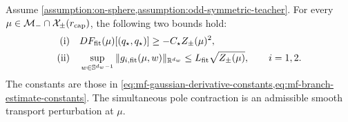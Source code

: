 \begin{lemma}
\label{lem:mf-pole-contraction-estimates}
Assume \cref{assumption:on-sphere,assumption:odd-symmetric-teacher}.
For every \(\mu\in\mathcal{M}_{-}\cap
\mathcal X_\pm(r_{\mathrm{cap}})\), the following two bounds hold:
\begin{equation}
\label{eq:mf-pole-contraction-estimates}
\begin{aligned}
 \textup{(i)}\quad &DF_{\mathrm{fit}}(\mu)[(q_\star,q_\star)]
                  \ge-C_\star Z_\pm(\mu)^2,\\
 \textup{(ii)}\quad &\sup_{w\in\mathbb{S}^{d_w-1}}
       \|g_{i,\mathrm{fit}}(\mu,w)\|_{\mathbb R^{d_w}}
       \le L_{\mathrm{fit}}\sqrt{Z_\pm(\mu)},\qquad i=1,2.
\end{aligned}
\end{equation}
The constants are those in
\cref{eq:mf-gaussian-derivative-constants,eq:mf-branch-estimate-constants}.
The simultaneous pole contraction is an admissible smooth transport
perturbation at \(\mu\).
\end{lemma}

